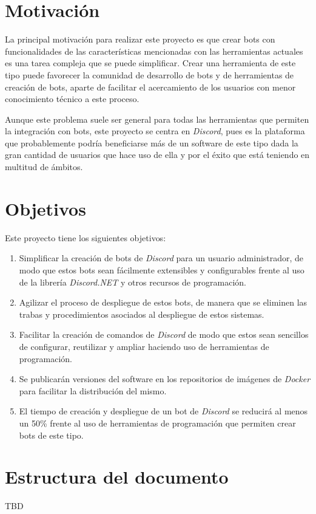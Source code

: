 \section{Motivación}

La principal motivación para realizar este proyecto es que crear bots con funcionalidades de las características mencionadas con las herramientas actuales es una tarea compleja que se puede simplificar. Crear una herramienta de este tipo puede favorecer la comunidad de desarrollo de bots y de herramientas de creación de bots, aparte de facilitar el acercamiento de los usuarios con menor conocimiento técnico a este proceso.

Aunque este problema suele ser general para todas las herramientas que permiten la integración con bots, este proyecto se centra en \textit{Discord}, pues es la plataforma que probablemente podría beneficiarse más de un software de este tipo dada la gran cantidad de usuarios que hace uso de ella y por el éxito\cite{enlyft} que está teniendo en multitud de ámbitos.

\section{Objetivos}

Este proyecto tiene los siguientes objetivos:

\begin{enumerate}
	\item Simplificar la creación de bots de \textit{Discord} para un usuario administrador, de modo que estos bots sean fácilmente extensibles y configurables frente al uso de la librería \textit{Discord.NET} y otros recursos de programación.
	\item Agilizar el proceso de despliegue de estos bots, de manera que se eliminen las trabas y procedimientos asociados al despliegue de estos sistemas.
	\item Facilitar la creación de comandos de \textit{Discord} de modo que estos sean sencillos de configurar, reutilizar y ampliar haciendo uso de herramientas de programación.
	\item Se publicarán versiones del software en los repositorios de imágenes de \textit{Docker} para facilitar la distribución del mismo.
	\item El tiempo de creación y despliegue de un bot de \textit{Discord} se reducirá al menos un 50\% frente al uso de herramientas de programación que permiten crear bots de este tipo.
\end{enumerate}

\section{Estructura del documento}

TBD
